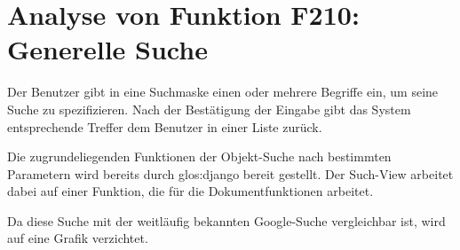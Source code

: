 \section{Analyse von Funktion F210: Generelle Suche}
Der Benutzer gibt in eine Suchmaske einen oder mehrere Begriffe ein, um seine
Suche zu spezifizieren. Nach der Bestätigung der Eingabe gibt das System
entsprechende Treffer dem Benutzer in einer Liste zurück.

Die zugrundeliegenden Funktionen der Objekt-Suche nach bestimmten Parametern
wird bereits durch \gls{glos:django} bereit gestellt. Der Such-View arbeitet dabei auf
einer Funktion, die für die Dokumentfunktionen arbeitet.

Da diese Suche mit der weitläufig bekannten Google-Suche vergleichbar ist, wird
auf eine Grafik verzichtet.
